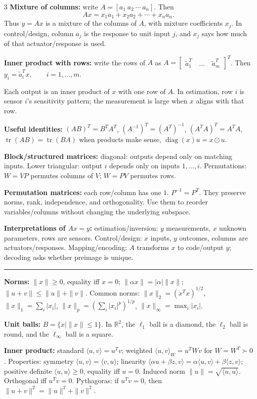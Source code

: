 \documentclass[10pt]{article}
\newcommand{\sect}[1]{\vspace{0.9pt}{\fontsize{7.2}{7.5}\selectfont\textbf{#1}}\vspace{0.25pt}\hrule\vspace{0.8pt}}
\newcommand{\sub}[1]{\textbf{#1}}
\newcommand{\R}{\mathbb{R}}
\newcommand{\diag}{\operatorname{diag}}
\newcommand{\tr}{\operatorname{tr}}
\begin{document}
\begin{multicols*}{3}
\sub{Mixture of columns:} write \(A=[a_1\ a_2\ \cdots\ a_n]\). Then
\[
    Ax=x_1a_1+x_2a_2+\cdots+x_na_n.
\]
Thus \(y=Ax\) is a mixture of the columns of \(A\), with mixture
coefficients \(x_j\). In control/design, column \(a_j\) is the response
to unit input \(j\), and \(x_j\) says how much of that actuator/response
is used.

\sub{Inner product with rows:} write the rows of \(A\) as
\(
    A= \left[
    \begin{matrix}
        \tilde a_1^T \quad
        \dots \quad
        \tilde a_m^T
    \end{matrix}
    \right]^T
\). Then
\(
    y_i=\tilde a_i^Tx,\qquad i=1,\ldots,m.
\)

Each output is an inner product of \(x\) with one row of \(A\). In
estimation, row \(i\) is sensor \(i\)'s sensitivity pattern; the
measurement is large when \(x\) aligns with that row.

\sub{Useful identities:} $(AB)^T=B^TA^T$, $(A^{-1})^T=(A^T)^{-1}$, $(A^TA)^T=A^TA$, $\tr(AB)=\tr(BA)$ when products make sense, $\diag(x)u=x\odot u$.

\sub{Block/structured matrices:} diagonal: outputs depend only on matching inputs. Lower triangular: output $i$ depends only on inputs $1,\ldots,i$. Permutations: $W=VP$ permutes columns of $V$; $W=PV$ permutes rows.

\sub{Permutation matrices:} each row/column has one $1$. $P^{-1}=P^T$. They preserve norms, rank, independence, and orthogonality. Use them to reorder variables/columns without changing the underlying subspace.

\sub{Interpretations of \(Ax=y\):} estimation/inversion: $y$ measurements, $x$ unknown parameters, rows are sensors. Control/design: $x$ inputs, $y$ outcomes, columns are actuators/responses. Mapping/encoding: $A$ transforms $x$ to code/output $y$; decoding asks whether preimage is unique.

\sect{Linear Algebra Review}
\sub{Norms:} $\|x\|\ge0$, equality iff $x=0$; $\|\alpha x\|=|\alpha|\|x\|$; $\|u+v\|\le\|u\|+\|v\|$. Common norms: \(\|x\|_2=(x^Tx)^{1/2}\), \(\|x\|_1=\sum_i|x_i|\), \(\|x\|_p=(\sum_i |x_i|^p)^{1/p}\), \(\|x\|_\infty=\max_i|x_i|\).

\sub{Unit balls:} \(B=\{x\mid \|x\|\le1\}\). In \(\R^2\), the
\(\ell_1\) ball is a diamond, the \(\ell_2\) ball is round, and the
\(\ell_\infty\) ball is a square.

\sub{Inner product:} standard $\langle u,v\rangle=u^Tv$; weighted $\langle u,v\rangle_W=u^TWv$ for $W=W^T\succ0$. Properties: symmetry \(\langle u,v\rangle=\langle v,u\rangle\); linearity \(\langle \alpha u+\beta z,v\rangle=\alpha\langle u,v\rangle+\beta\langle z,v\rangle\); positive definite \(\langle u,u\rangle\ge0\), equality iff \(u=0\). Induced norm $\|u\|=\sqrt{\langle u,u\rangle}$. Orthogonal iff $u^Tv=0$. Pythagoras: if $u^Tv=0$, then $\|u+v\|^2=\|u\|^2+\|v\|^2$.


\end{multicols*}
\end{document}
